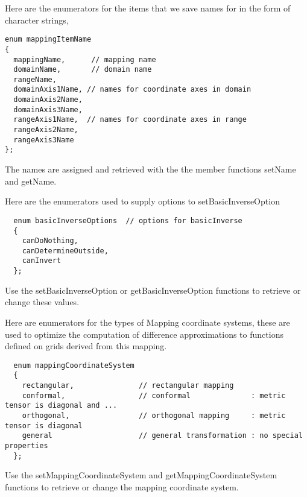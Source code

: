 \documentclass[xcolor=rgb,svgnames,dvipsnames]{article}
\newcommand{\Index}[1]{#1\index{#1}}
\begin{document}
\vspace{\baselineskip\noindent}
Here are the enumerators for the items that we save names for in the
form of character strings,
{\footnotesize
\begin{verbatim}
enum mappingItemName
{
  mappingName,      // mapping name
  domainName,       // domain name
  rangeName,
  domainAxis1Name, // names for coordinate axes in domain
  domainAxis2Name, 
  domainAxis3Name, 
  rangeAxis1Name,  // names for coordinate axes in range
  rangeAxis2Name, 
  rangeAxis3Name 
};
\end{verbatim}
}
\noindent
The names are assigned and retrieved with the the member functions
{\ff setName} and {\ff getName}.


Here are the enumerators used to supply options to {\ff setBasicInverseOption}
{\footnotesize
\begin{verbatim}
  enum basicInverseOptions  // options for basicInverse
  {
    canDoNothing,
    canDetermineOutside,
    canInvert
  };
\end{verbatim}
}
\noindent
Use the {\ff setBasicInverseOption} or {\ff getBasicInverseOption}
functions to retrieve or change these values.


Here are enumerators for the types of Mapping \Index{coordinate systems}, these are
used to optimize the computation of difference approximations to functions
defined on grids derived from this mapping.
{\footnotesize
\begin{verbatim}
  enum mappingCoordinateSystem
  {
    rectangular,               // rectangular mapping
    conformal,                 // conformal              : metric tensor is diagonal and ...
    orthogonal,                // orthogonal mapping     : metric tensor is diagonal
    general                    // general transformation : no special properties
  };
\end{verbatim}
}
\noindent Use the {\ff setMappingCoordinateSystem} and {\ff getMappingCoordinateSystem}
functions to retrieve or change the mapping coordinate system.

% 
% 
% 
% 
% 
\end{document}
